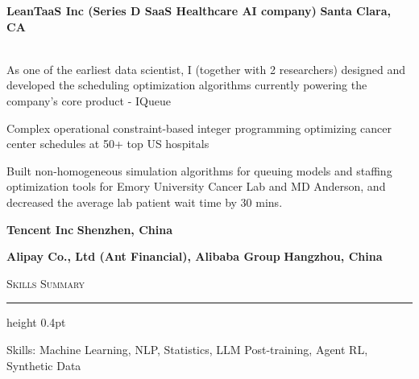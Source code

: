 \documentclass[10pt,letterpaper]{article}
\newcommand{\ress}[1]{%
  \vspace{6pt}%
  {\large\scshape #1}\par
  \vspace{3pt}%
  \hrule height 0.4pt%
  \vspace{4pt}%
}
\begin{document}
\noindent\textbf{LeanTaaS Inc (Series D SaaS Healthcare AI company)} \hfill \textbf{Santa Clara, CA}\\
\\
\vspace{-10pt}
\begin{rbullets}\small
\item As one of the earliest data scientist, I (together with 2 researchers) designed and developed the scheduling optimization algorithms currently powering the company's core product - IQueue
\item Complex operational constraint-based integer programming optimizing cancer center schedules at 50+ top US hospitals
\item Built non-homogeneous simulation algorithms for queuing models and staffing optimization tools for Emory University Cancer Lab and MD Anderson, and decreased the average lab patient wait time by 30 mins.
\end{rbullets}

\noindent\textbf{Tencent Inc} \hfill \textbf{Shenzhen, China}\\

\vspace{2pt}

\noindent\textbf{Alipay Co., Ltd (Ant Financial), Alibaba Group} \hfill \textbf{Hangzhou, China}\\

\ress{Skills Summary}

\noindent\small\textbullet\hspace{8pt}Skills: Machine Learning, NLP, Statistics, LLM Post-training, Agent RL, Synthetic Data
\end{document}
